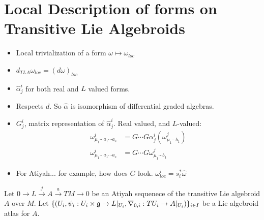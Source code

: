 \section{Local Description of forms on Transitive Lie Algebroids}

\begin{itemize}
    
\item Local trivialization of a form $\omega \mapsto \omega_{loc}$

\item $d_{TLA}\omega_{loc} = (d \omega)_{loc}$

\item $\hat \alpha^i_j$ for both real and $L$ valued forms.

\item Respects $d$. So $\hat \alpha$ is isomorphism of differential graded algebras.

\item $G^i_j$, matrix representation of $\hat \alpha^i_j$. Real valued, and $L$-valued:
    \begin{align}
        \omega^i_{\mu_1 \cdots a_1 \cdots a_s} &= G\cdots G \alpha^i_j(\omega^j_{\mu_1 \cdots b_1}) \\
        \omega^i_{\mu_1 \cdots a_1 \cdots a_s} &= G\cdots G \omega^j_{\mu_1 \cdots b_1}
    \end{align}

\item For Atiyah... for example, how does $G$ look. $\omega^i_{loc} = s_i^* \hat \omega$
    
\end{itemize}



Let $0 \to L \xrightarrow{j} A \xrightarrow{a} TM \to 0$ be an Atiyah sequenece of the transitive Lie algebroid $A$ over $M$. Let $\{(U_i, \psi_i: U_i \times \mathfrak{g} \to L|_{U_i}, \nabla_{0, i}: TU_i \to A|_{U_i})\}_{i \in I}$ be a Lie algebroid atlas for $A$.


